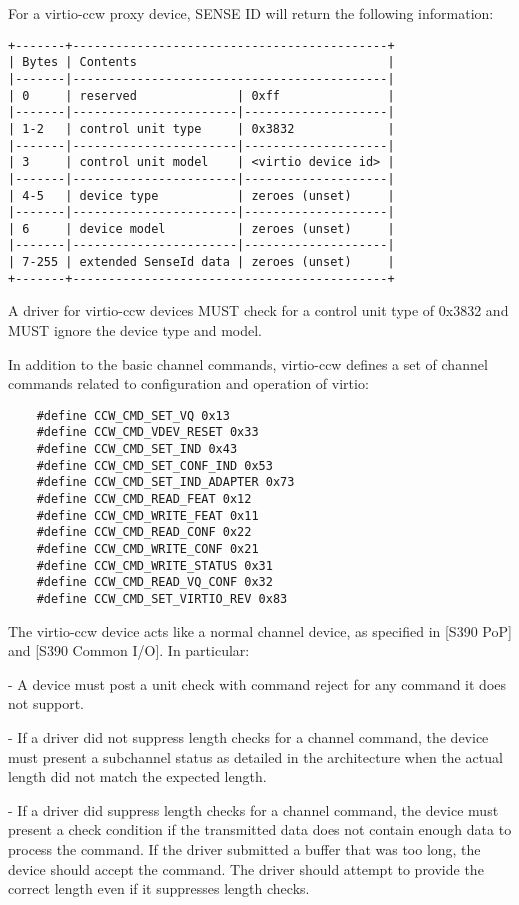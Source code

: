 For a virtio-ccw proxy device, SENSE ID will return the following
information:

\begin{verbatim}
+-------+--------------------------------------------+
| Bytes | Contents                                   |
|-------|--------------------------------------------|
| 0     | reserved              | 0xff               |
|-------|-----------------------|--------------------|
| 1-2   | control unit type     | 0x3832             |
|-------|-----------------------|--------------------|
| 3     | control unit model    | <virtio device id> |
|-------|-----------------------|--------------------|
| 4-5   | device type           | zeroes (unset)     |
|-------|-----------------------|--------------------|
| 6     | device model          | zeroes (unset)     |
|-------|-----------------------|--------------------|
| 7-255 | extended SenseId data | zeroes (unset)     |
+-------+--------------------------------------------+
\end{verbatim}

A driver for virtio-ccw devices MUST check for a control unit
type of 0x3832 and MUST ignore the device type and model.

In addition to the basic channel commands, virtio-ccw defines a
set of channel commands related to configuration and operation of
virtio:

\begin{lstlisting}
	#define CCW_CMD_SET_VQ 0x13
	#define CCW_CMD_VDEV_RESET 0x33
	#define CCW_CMD_SET_IND 0x43
	#define CCW_CMD_SET_CONF_IND 0x53
	#define CCW_CMD_SET_IND_ADAPTER 0x73
	#define CCW_CMD_READ_FEAT 0x12
	#define CCW_CMD_WRITE_FEAT 0x11
	#define CCW_CMD_READ_CONF 0x22
	#define CCW_CMD_WRITE_CONF 0x21
	#define CCW_CMD_WRITE_STATUS 0x31
	#define CCW_CMD_READ_VQ_CONF 0x32
	#define CCW_CMD_SET_VIRTIO_REV 0x83
\end{lstlisting}

The virtio-ccw device acts like a normal channel device, as specified
in [S390 PoP] and [S390 Common I/O]. In particular:

- A device must post a unit check with command reject for any command
  it does not support.

- If a driver did not suppress length checks for a channel command,
  the device must present a subchannel status as detailed in the
  architecture when the actual length did not match the expected length.

- If a driver did suppress length checks for a channel command, the
  device must present a check condition if the transmitted data does
  not contain enough data to process the command. If the driver submitted
  a buffer that was too long, the device should accept the command.
  The driver should attempt to provide the correct length even if it
  suppresses length checks.


